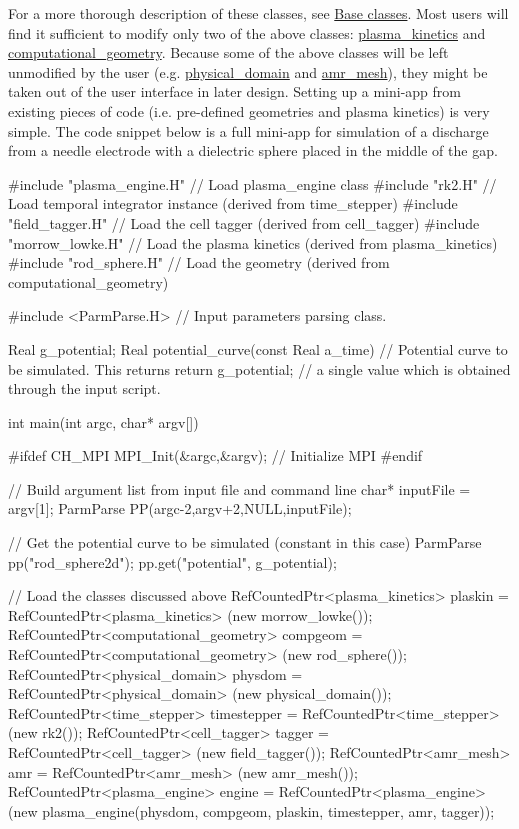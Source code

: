 For a more thorough description of these classes, see \hyperlink{base-classes}{Base classes}. Most users will find it sufficient to modify only two of the above classes\+: \hyperlink{classplasma__kinetics}{plasma\+\_\+kinetics} and \hyperlink{classcomputational__geometry}{computational\+\_\+geometry}. Because some of the above classes will be left unmodified by the user (e.\+g. \hyperlink{classphysical__domain}{physical\+\_\+domain} and \hyperlink{classamr__mesh}{amr\+\_\+mesh}), they might be taken out of the user interface in later design. Setting up a mini-\/app from existing pieces of code (i.\+e. pre-\/defined geometries and plasma kinetics) is very simple. The code snippet below is a full mini-\/app for simulation of a discharge from a needle electrode with a dielectric sphere placed in the middle of the gap. \begin{DoxyVerb}  #include "plasma_engine.H"   // Load plasma_engine class
  #include "rk2.H"             // Load temporal integrator instance (derived from time_stepper)
  #include "field_tagger.H"    // Load the cell tagger (derived from cell_tagger)
  #include "morrow_lowke.H"    // Load the plasma kinetics (derived from plasma_kinetics)
  #include "rod_sphere.H"      // Load the geometry (derived from computational_geometry)

  #include <ParmParse.H>       // Input parameters parsing class. 

  Real g_potential;    
  Real potential_curve(const Real a_time){ // Potential curve to be simulated. This returns
    return g_potential;                    // a single value which is obtained through the input script. 
  }

  int main(int argc, char* argv[]){

  #ifdef CH_MPI
    MPI_Init(&argc,&argv);  // Initialize MPI
  #endif

    // Build argument list from input file and command line
    char* inputFile = argv[1];
    ParmParse PP(argc-2,argv+2,NULL,inputFile);

    { // Get the potential curve to be simulated (constant in this case)
      ParmParse pp("rod_sphere2d");
      pp.get("potential", g_potential);
    }

    // Load the classes discussed above
    RefCountedPtr<plasma_kinetics> plaskin         = RefCountedPtr<plasma_kinetics> (new morrow_lowke());
    RefCountedPtr<computational_geometry> compgeom = RefCountedPtr<computational_geometry> (new rod_sphere());
    RefCountedPtr<physical_domain> physdom         = RefCountedPtr<physical_domain> (new physical_domain());
    RefCountedPtr<time_stepper> timestepper        = RefCountedPtr<time_stepper>(new rk2());
    RefCountedPtr<cell_tagger> tagger              = RefCountedPtr<cell_tagger> (new field_tagger());   
    RefCountedPtr<amr_mesh> amr                    = RefCountedPtr<amr_mesh> (new amr_mesh());
    RefCountedPtr<plasma_engine> engine            = RefCountedPtr<plasma_engine> (new plasma_engine(physdom, compgeom, plaskin, timestepper, amr, tagger));

}
\end{DoxyVerb}
